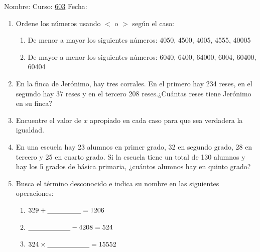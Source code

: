 \documentclass[fleqn]{article}
\newcommand{\LineaNombre}{%
\par
\vspace{\baselineskip}
Nombre:\hrulefill \; Curso: \underline{603} \; Fecha: \underline{\hspace*{2.5cm}} \relax
\par}
\begin{document}
\LineaNombre
\begin{enumerate}
   \item Ordene los números usando $<$ o $>$ según el caso: 
      \begin{enumerate}
	 \item De menor a mayor los siguientes números: 4050, 4500, 4005, 4555, 40005\answer
	 \item De mayor a menor los siguientes números: 6040, 6400, 64000, 6004, 60400, 60404\answer
      \end{enumerate}
  \item En la finca de Jerónimo, hay tres corrales. En el primero hay 234 reses, en el segundo hay 37 reses y en el tercero 208 reses.¿Cuántas reses tiene Jerónimo en su finca?\noanswer
  \item Encuentre el valor de $x$ apropiado en cada caso para que sea verdadera la igualdad.
  \begin{enumerate}
  \end{enumerate}
  \item En una escuela hay 23 alumnos en primer grado, 32 en segundo grado, 28 en tercero y 25 en cuarto grado. Si la escuela tiene un total de 130 alumnos y hay los 5 grados de básica primaria, ¿cuántos alumnos hay en quinto grado? \noanswer
   \item Busca el término desconocido e indica su nombre en las siguientes operaciones:
   \begin{enumerate}
   \item $329+\underline{\hspace*{48pt}}=1206$\noanswer
   \item $\underline{\hspace*{60pt}}-4208=524$\noanswer
   \item $324\times \underline{\hspace*{60pt}}=15552 $\noanswer
   \end{enumerate}
\end{enumerate}
\end{document}
